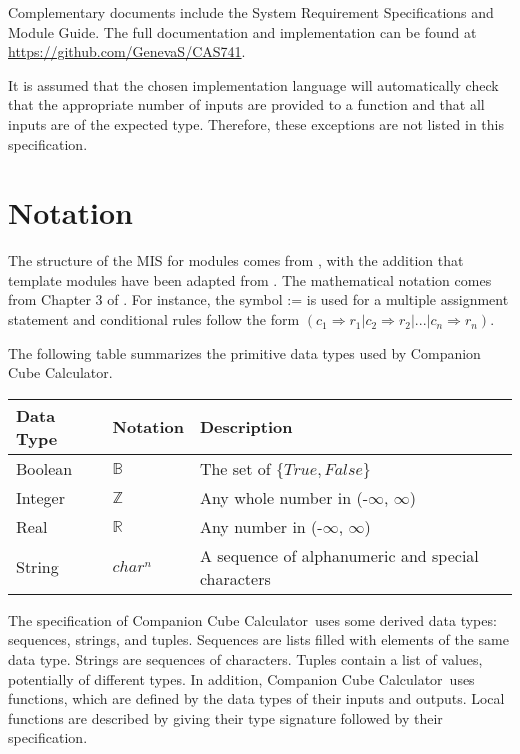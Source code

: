 \documentclass[12pt, titlepage]{article}
\newcommand{\progname}{Companion Cube Calculator}
\begin{document}
Complementary documents include the System Requirement Specifications
and Module Guide.  The full documentation and implementation can be
found at \url{https://github.com/GenevaS/CAS741}.

It is assumed that the chosen implementation language will automatically check 
that the appropriate number of inputs are provided to a function and that all 
inputs are of the expected type. Therefore, these exceptions are not listed in 
this specification.

\section{Notation}

The structure of the MIS for modules comes from \citet{HoffmanAndStrooper1995},
with the addition that template modules have been adapted from
\cite{GhezziEtAl2003}.  The mathematical notation comes from Chapter 3 of
\citet{HoffmanAndStrooper1995}.  For instance, the symbol := is used for a
multiple assignment statement and conditional rules follow the form $(c_1
\Rightarrow r_1 | c_2 \Rightarrow r_2 | ... | c_n \Rightarrow r_n )$.

The following table summarizes the primitive data types used by \progname. 

\begin{center}
\renewcommand{\arraystretch}{1.2}
\noindent 
\begin{tabular}{l l p{7.5cm}} 
\toprule 
\textbf{Data Type} & \textbf{Notation} & \textbf{Description}\\ 
\midrule
Boolean & $\mathbb{B}$ & The set of $\{True, False\}$\\
Integer & $\mathbb{Z}$ & Any whole number in (-$\infty$, $\infty$)\\
Real & $\mathbb{R}$ & Any number in (-$\infty$, $\infty$)\\
\multirow{2}{1cm}{String} & \multirow{2}{1cm}{$char^n$} & A sequence of 
alphanumeric and special characters\\
\bottomrule
\end{tabular} 
\end{center}

\noindent
The specification of \progname \ uses some derived data types: sequences, strings, and
tuples. Sequences are lists filled with elements of the same data type. Strings
are sequences of characters. Tuples contain a list of values, potentially of
different types. In addition, \progname \ uses functions, which
are defined by the data types of their inputs and outputs. Local functions are
described by giving their type signature followed by their specification.
\end{document}
